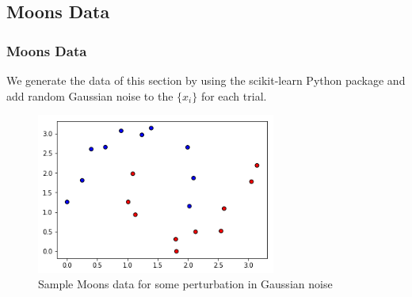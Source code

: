 \documentclass{beamer}
\newcommand\0{\mathbf{0}}
\newcommand\<{\langle}
\renewcommand\>{\rangle}
\begin{document}

%
%
%

\subsection{Moons Data}
\label{sec:moon}

\begin{frame}
\frametitle{Moons Data}	
We generate the data of this section by using the scikit-learn Python package and add random Gaussian noise to the $\{x_i\}$ for each trial.

\begin{figure}[H]
\centering
\includegraphics[width=0.7\textwidth]{images/moons_data}
\caption{Sample Moons data for some perturbation in Gaussian noise}
\end{figure}
\end{frame}
\end{document}
